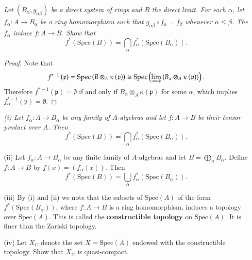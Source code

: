 \begin{problem}\em
Let $(B_\alpha,g_{\alpha\beta})$ be a direct system of rings and $B$ the direct limit. For each $\alpha$, let $f_\alpha:A\to B_\alpha$ be a ring homomorphism such that $g_{\alpha\beta}\circ f_\alpha=f_\beta$ whenever $\alpha\le\beta$. The $f_\alpha$ induce $f:A\to B$. Show that 
$$
f^*\left( \mathrm{Spec}\left( B \right) \right) =\bigcap_{\alpha}{f_{\alpha}^{*}\left( \mathrm{Spec}\left( B_{\alpha} \right) \right)}.
$$
\end{problem}
\begin{proof}
Note that 
$$
f^{*-1}\left( \mathfrak{p} \right) =\mathrm{Spec}\left( B\otimes _A\kappa \left( \mathfrak{p} \right) \right) \cong \mathrm{Spec}\left( \varinjlim\left( B_{\alpha}\otimes _A\kappa \left( \mathfrak{p} \right) \right) \right) .
$$
Therefore $f^{*-1}(\mathfrak{p})=\emptyset$ if and only if $B_\alpha\otimes_A\kappa(\mathfrak{p})$ for some $\alpha$, which implies $f_\alpha^{*-1}(\mathfrak{p})=\emptyset$.
\end{proof}
\begin{problem}\em
(i) Let $f_\alpha:A\to B_\alpha$ be any family of $A$-algebras and let $f:A\to B$ be their tensor product over $A$. Then 
$$
f^*\left( \mathrm{Spec}\left( B \right) \right) =\bigcap_{\alpha}{f_{\alpha}^{*}\left( \mathrm{Spec}\left( B_{\alpha} \right) \right)}.
$$\par
(ii) Let $f_\alpha:A\to B_\alpha$ be any finite family of $A$-algebras and let $B=\bigoplus_{\alpha}B_\alpha$. Define $f:A\to B$ by $f(x)=(f_\alpha(x))$. Then 
$$
f^*\left( \mathrm{Spec}\left( B \right) \right) =\bigcup_{\alpha}{f_{\alpha}^{*}\left( \mathrm{Spec}\left( B_{\alpha} \right) \right)}.
$$\par
(iii) By (i) and (ii) we note that the subsets of $\mathrm{Spec}(A)$ of the form $f^*(\mathrm{Spec}(B_\alpha))$, where $f:A\to B$ is a ring homomorphism, induces a topology over $\mathrm{Spec}(A)$. This is called the \textbf{constructible topology} on $\mathrm{Spec}(A)$. It is finer than the Zariski topology.\par
(iv) Let $X_C$ denote the set $X=\mathrm{Spec}(A)$ endowed with the constructible topology. Show that $X_C$ is quasi-compact.
\end{problem}
